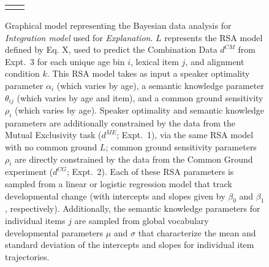\documentclass{article}
\begin{document}
\begin{figure}[ht]
\begin{center}
\begin{tabular}{cc}
\begin{tikzpicture}
\end{tikzpicture}

    \end{tabular}
  \end{center}
  \caption{Graphical model representing the Bayesian data analysis for \emph{Integration model} used for \emph{Explanation}. $L$ represents the RSA model defined by Eq. X, used to predict the Combination Data $d^{CM}$  from Expt.~3 for each unique age bin $i$, lexical item $j$, and alignment condition $k$. This RSA model takes as input a speaker optimality parameter $\alpha_i$ (which varies by age), a semantic knowledge parameter $\theta_{ij}$ (which varies by age and item), and a common ground sensitivity $\rho_i$ (which varies by age). Speaker optimality and semantic knowledge parameters are additionally constrained by the data from the Mutual Exclusivity task ($d^{ME}$; Expt.~1), via the same RSA model with no common ground $L$;  common ground sensitivity parameters $\rho_i$ are directly constrained by the data from the Common Ground experiment ($d^{CG}$; Expt.~2).  
  Each of these RSA parameters is sampled from a linear or logistic regression model that track developmental change (with intercepts and slopes given by $\beta_0$ and $\beta_1$, respectively). Additionally, the semantic knowledge parameters for individual items $j$ are sampled from global vocabulary developmental parameters $\mu$ and $\sigma$ that characterize the mean and standard deviation of the intercepts and slopes for individual item trajectories.}
  \label{fig:bayesnet}
\end{figure}
\end{document}
